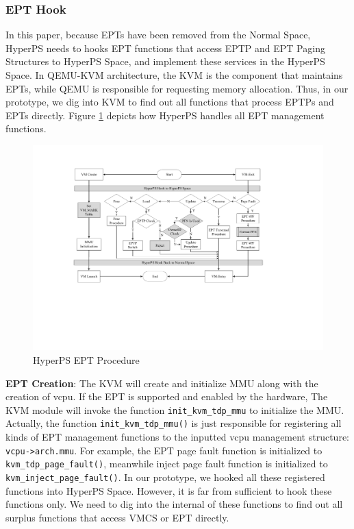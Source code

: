 \subsubsection{EPT Hook}%
\label{ssub:ept_hook}


In this paper, because EPTs have been removed from the Normal Space, 
HyperPS needs to hooks EPT functions that access EPTP and EPT Paging Structures to HyperPS Space, and implement these services in the HyperPS Space.
In QEMU-KVM architecture, the KVM is the component that maintains EPTs, while QEMU is responsible for requesting memory allocation.
Thus, in our prototype, we dig into KVM to find out all functions that process EPTPs and EPTs directly. Figure \ref{fig:impept} depicts how HyperPS handles all EPT management functions. 

\begin{figure}[htpb]
    \centering
    \includegraphics[width=1\linewidth]{./IMG/imp-ept-handle.pdf}
    \caption{HyperPS EPT Procedure}%
    \label{fig:impept}
\end{figure}

\textbf{EPT Creation}: The KVM will create and initialize MMU along with the creation of vcpu. 
If the EPT is supported and enabled by the hardware, The KVM module will invoke the function \verb|init_kvm_tdp_mmu| to initialize the MMU. 
Actually, the function \verb|init_kvm_tdp_mmu()| is just responsible for registering all kinds of EPT management functions to the inputted vcpu management structure: \verb|vcpu->arch.mmu|. 
For example, the EPT page fault function is initialized to \verb|kvm_tdp_page_fault()|, meanwhile inject page fault function is initialized to \verb|kvm_inject_page_fault()|. 
In our prototype, we hooked all these registered functions into HyperPS Space. However, it is far from sufficient to hook these functions only. We need to dig into the internal of these functions to find out all surplus functions that access VMCS or EPT directly.

